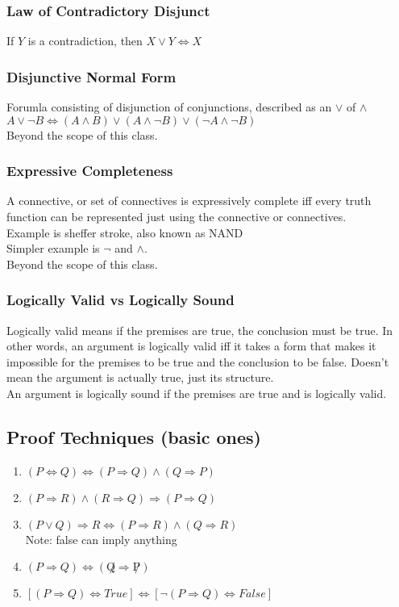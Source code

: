 \documentclass[a4paper]{article}
\begin{document}
\subsubsection{Law of Contradictory Disjunct}
If $Y$ is a contradiction, then $X \lor Y \Leftrightarrow X$

\subsubsection{Disjunctive Normal Form}
Forumla consisting of disjunction of conjunctions, described as an $\lor$ of $\land$\\
$A \lor \lnot B \Leftrightarrow (A \land B)\lor(A \land \lnot B)\lor(\lnot A \land \lnot B)$\\
Beyond the scope of this class.
\subsubsection{Expressive Completeness}
A connective, or set of connectives is expressively complete iff every truth function can be represented just using the connective or connectives.\\
Example is sheffer stroke, also known as NAND\\ 
Simpler example is $\lnot$ and $\land$.\\
Beyond the scope of this class.
\subsubsection{Logically Valid vs Logically Sound}
Logically valid means if the premises are true, the conclusion must be true.
In other words, an argument is logically valid iff it takes a form that makes it impossible for the premises to be true and the conclusion to be false.
Doesn't mean the argument is actually true, just its structure.\\
An argument is logically sound if the premises are true and is logically valid.

\subsection{Proof Techniques (basic ones)}

\begin{enumerate}[i]
	\item $(P \Leftrightarrow Q) \Leftrightarrow (P \Rightarrow Q) \land (Q \Rightarrow P)$ 
	\item $(P \Rightarrow R) \land (R \Rightarrow Q) \Rightarrow (P \Rightarrow Q)$
	\item $(P \lor Q) \Rightarrow R \Leftrightarrow (P \Rightarrow R) \land (Q \Rightarrow R)$\\ Note: false can imply anything
	\item{$(P \Rightarrow Q) \Leftrightarrow (\not Q \Rightarrow \not P)$}
	\item {$[(P \Rightarrow Q) \Leftrightarrow True] \Leftrightarrow [\lnot (P \Rightarrow Q) \Leftrightarrow False]$}
\end{enumerate}
\end{document}
